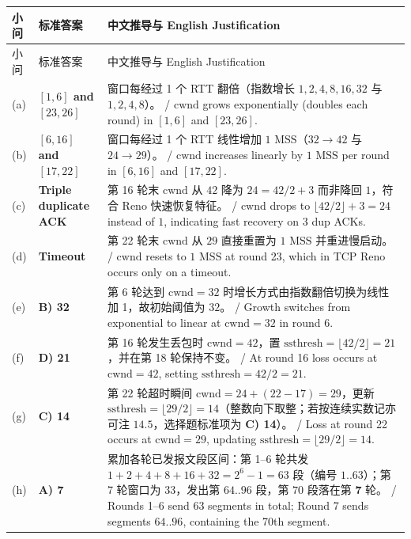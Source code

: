 \begingroup\small\setlength{\tabcolsep}{3pt}\renewcommand{\arraystretch}{1.22}
\begin{longtable}{@{}>{\raggedright\arraybackslash}p{}>{\raggedright\arraybackslash}p{}>{\raggedright\arraybackslash}p{}@{}}
\toprule
小问 & 标准答案 & 中文推导与 English Justification \\
\midrule\endfirsthead
小问 & 标准答案 & 中文推导与 English Justification \\
\midrule\endhead
\bottomrule\endfoot
(a) & \textbf{$[1, 6]$ and $[23, 26]$} & 窗口每经过 1 个 RTT 翻倍（指数增长 $1,2,4,8,16,32$ 与 $1,2,4,8$）。 / $\mathrm{cwnd}$ grows exponentially (doubles each round) in $[1,6]$ and $[23,26]$. \\
(b) & \textbf{$[6, 16]$ and $[17, 22]$} & 窗口每经过 1 个 RTT 线性增加 $1\text{ MSS}$（$32\to 42$ 与 $24\to 29$）。 / $\mathrm{cwnd}$ increases linearly by $1\text{ MSS}$ per round in $[6,16]$ and $[17,22]$. \\
(c) & \textbf{Triple duplicate ACK} & 第 16 轮末 $\mathrm{cwnd}$ 从 $42$ 降为 $24 = 42/2 + 3$ 而非降回 $1$，符合 Reno 快速恢复特征。 / $\mathrm{cwnd}$ drops to $\lfloor 42/2\rfloor + 3 = 24$ instead of $1$, indicating fast recovery on 3 dup ACKs. \\
(d) & \textbf{Timeout} & 第 22 轮末 $\mathrm{cwnd}$ 从 $29$ 直接重置为 $1\text{ MSS}$ 并重进慢启动。 / $\mathrm{cwnd}$ resets to $1\text{ MSS}$ at round 23, which in TCP Reno occurs only on a timeout. \\
(e) & \textbf{B) 32} & 第 6 轮达到 $\mathrm{cwnd}=32$ 时增长方式由指数翻倍切换为线性加 1，故初始阈值为 $32$。 / Growth switches from exponential to linear at $\mathrm{cwnd}=32$ in round 6. \\
(f) & \textbf{D) 21} & 第 16 轮发生丢包时 $\mathrm{cwnd}=42$，置 $\mathrm{ssthresh} = \lfloor 42/2\rfloor = 21$，并在第 18 轮保持不变。 / At round 16 loss occurs at $\mathrm{cwnd}=42$, setting $\mathrm{ssthresh}=42/2=21$. \\
(g) & \textbf{C) 14} & 第 22 轮超时瞬间 $\mathrm{cwnd} = 24 + (22-17) = 29$，更新 $\mathrm{ssthresh} = \lfloor 29/2\rfloor = 14$（整数向下取整；若按连续实数记亦可注 $14.5$，选择题标准项为 \textbf{C) 14}）。 / Loss at round 22 occurs at $\mathrm{cwnd}=29$, updating $\mathrm{ssthresh}=\lfloor 29/2\rfloor = 14$. \\
(h) & \textbf{A) 7} & 累加各轮已发报文段区间：第 1–6 轮共发 $1+2+4+8+16+32 = 2^6 - 1 = 63$ 段（编号 $1..63$）；第 7 轮窗口为 $33$，发出第 \textbf{$64..96$} 段，第 $70$ 段落在第 \textbf{7} 轮。 / Rounds 1–6 send $63$ segments in total; Round 7 sends segments $64..96$, containing the 70th segment. \\

\end{longtable}
